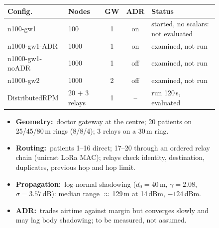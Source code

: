\documentclass[10pt,a4paper]{article}
\newcommand{\lead}[1]{\textbf{#1}\,}
\begin{document}
\begin{figure}[!htb]
\begin{minipage}[c]{0.47\textwidth}
\centering\footnotesize
{}
\label{tab:simcfg}
\begin{tabularx}{\linewidth}{@{}L{2.2cm}L{0.95cm}ccY@{}}
\toprule
Config. & Nodes & GW & ADR & Status\\
\midrule
n100-gw1 & 100 & 1 & on & started, no scalars: not evaluated\\
n1000-gw1-ADR & 1000 & 1 & on & examined, not run\\
n1000-gw1-noADR & 1000 & 1 & off & examined, not run\\
n1000-gw2 & 1000 & 2 & off & examined, not run\\
DistributedRPM & 20 + 3 relays & 1 & -- & run 120\,s, evaluated\\
\bottomrule
\end{tabularx}
\end{minipage}\hfill
\begin{minipage}[c]{0.5\textwidth}
\begin{itemize}
\item \lead{Geometry:} doctor gateway at the centre; 20 patients on 25/45/80\,m rings (8/8/4); 3 relays on a 30\,m ring.
\item \lead{Routing:} patients 1--16 direct; 17--20 through an ordered relay chain (unicast LoRa MAC); relays check identity, destination, duplicates, previous hop and hop limit.
\item \lead{Propagation:} log-normal shadowing ($d_0=40$\,m, $\gamma=2.08$, $\sigma=3.57$\,dB): median range $\approx$\,129\,m at 14\,dBm, $-124$\,dBm.
\item \lead{ADR:} trades airtime against margin but converges slowly and may lag body shadowing; to be measured, not assumed.
\end{itemize}
\end{minipage}
\end{figure}
\end{document}
